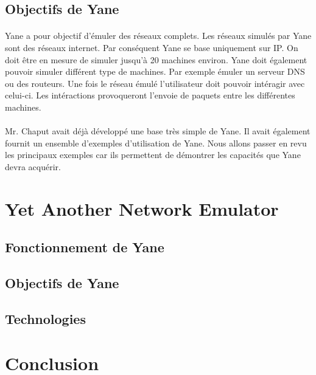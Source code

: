 \documentclass{article}
\begin{document}
	\subsection{Objectifs de Yane}
	\paragraph{}

	Yane a pour objectif d'émuler des réseaux complets. Les réseaux simulés par Yane sont des réseaux internet. Par conséquent Yane se base uniquement sur IP. On doit être en mesure de simuler jusqu'à 20 machines environ. Yane doit également pouvoir simuler différent type de machines. Par exemple émuler un serveur DNS ou des routeurs. Une fois le réseau émulé l'utilisateur doit pouvoir intéragir avec celui-ci. Les intéractions provoqueront l'envoie de paquets entre les différentes machines. 
	
	\paragraph{}
	Mr. Chaput avait déjà développé une base très simple de Yane. Il avait également fournit un ensemble d'exemples d'utilisation de Yane. Nous allons passer en revu les principaux exemples car ils permettent de démontrer les capacités que Yane devra acquérir.

	\newpage	



	\section{Yet Another Network Emulator}
		\subsection{Fonctionnement de Yane}
		\subsection{Objectifs de Yane}
		\subsection{Technologies}
		\newpage
	\section{Conclusion}
\end{document}
